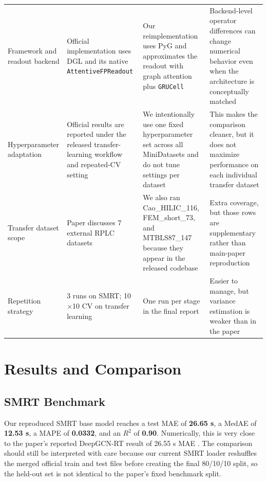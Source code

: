 \begin{table}[t]
{\begin{tabular}{p{3.2cm}p{5.1cm}p{5.1cm}p{4.1cm}}
            Framework and readout backend & Official implementation uses DGL and its native \texttt{AttentiveFPReadout}                                                               & Our reimplementation uses PyG and approximates the readout with graph attention plus \texttt{GRUCell}                      & Backend-level operator differences can change numerical behavior even when the architecture is conceptually matched     \\
            Hyperparameter adaptation     & Official results are reported under the released transfer-learning workflow and repeated-CV setting                                       & We intentionally use one fixed hyperparameter set across all MiniDatasets and do not tune settings per dataset             & This makes the comparison cleaner, but it does not maximize performance on each individual transfer dataset             \\
            Transfer dataset scope        & Paper discusses 7 external RPLC datasets                                                                                                  & We also ran Cao\_HILIC\_116, FEM\_short\_73, and MTBLS87\_147 because they appear in the released codebase                 & Extra coverage, but those rows are supplementary rather than main-paper reproduction                                    \\
            Repetition strategy           & 3 runs on SMRT; 10\(\times\)10 CV on transfer learning                                                                                    & One run per stage in the final report                                                                                      & Easier to manage, but variance estimation is weaker than in the paper                                                   \\
            \bottomrule
        \end{tabular}
    }
\end{table}

\section{Results and Comparison}

\subsection{SMRT Benchmark}

Our reproduced SMRT base model reaches a test MAE of \textbf{26.65 s}, a MedAE of \textbf{12.53 s}, a MAPE of \textbf{0.0332}, and an \(R^2\) of \textbf{0.90}. Numerically, this is very close to the paper's reported DeepGCN-RT result of 26.55 s MAE \cite{kang2023deepgcnrt}. The comparison should still be interpreted with care because our current SMRT loader reshuffles the merged official train and test files before creating the final 80/10/10 split, so the held-out set is not identical to the paper's fixed benchmark split.

